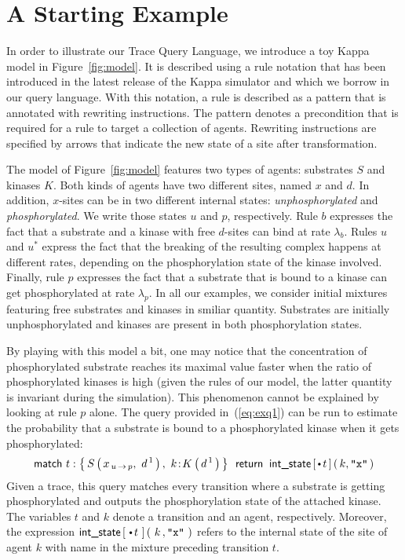 \documentclass[runningheads]{llncs}
\begin{document}


\section{A Starting Example}\label{sec:starting-example}

In order to illustrate our Trace Query Language, we introduce a toy
Kappa model in Figure~\ref{fig:model}. It is described using a rule
notation that has been introduced in the latest release of the Kappa
simulator and which we borrow in our query language. With this
notation, a rule is described as a pattern that is annotated with
rewriting instructions. The pattern denotes a precondition that is
required for a rule to target a collection of agents. Rewriting
instructions are specified by arrows that indicate the new state of a
site after transformation.

The model of Figure~\ref{fig:model} features two types of agents:
substrates $S$ and kinases $K$. Both kinds of agents have two
different sites, named $x$ and $d$. In addition, $x$-sites can be in
two different internal states: \textit{unphosphorylated} and
\textit{phosphorylated}. We write those states $u$ and $p$,
respectively. Rule $b$ expresses the fact that a substrate and a
kinase with free $d$-sites can bind at rate $\lambda_b$. Rules $u$ and
$u^*$ express the fact that the breaking of the resulting complex
happens at different rates, depending on the phosphorylation state of
the kinase involved. Finally, rule $p$ expresses the fact that a
substrate that is bound to a kinase can get phosphorylated at rate
$\lambda_p$. In all our examples, we consider initial mixtures
featuring free substrates and kinases in smiliar quantity. Substrates
are initially unphosphorylated and kinases are present in both
phosphorylation states.




By playing with this model a bit, one may notice that the
concentration of phosphorylated substrate reaches its maximal value
faster when the ratio of phosphorylated kinases is high (given the
rules of our model, the latter quantity is invariant during the
simulation). This phenomenon cannot be explained by looking at rule
$p$ alone. The query provided in~(\ref{eq:exq1}) can be run to
estimate the probability that a substrate is bound to a phosphorylated
kinase when it gets phosphorylated:
\begin{equation}\label{eq:exq1}
  \m{match } t:\Set{ \AG{S}{x_{\Trans{u}{p}},\ d^{\,1}},\ \iAG{k}{K}{d^{\,1}} }
  \, \m{ return } \: \IntState{\StateBefore{t}}{k}{\STR{x}}
\end{equation}
Given a trace, this query matches every transition where a substrate
is getting phosphorylated and outputs the phosphorylation state of the
attached kinase. The variables $t$ and $k$ denote a transition and an
agent, respectively. Moreover, the expression
$\IntState{\,\StateBefore{t}\,}{\,k\,}{\STR{x}\,}$ refers to the
internal state of the site of agent $k$ with name  in the
mixture preceding transition $t$.
\end{document}
